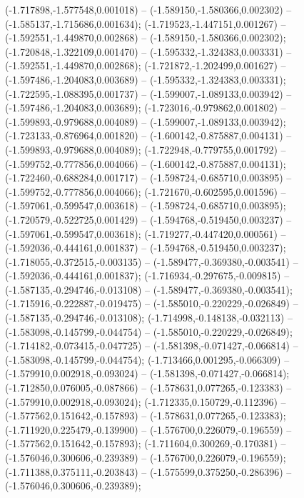  (-1.717898,-1.577548,0.001018) -- (-1.589150,-1.580366,0.002302) -- (-1.585137,-1.715686,0.001634);
 (-1.719523,-1.447151,0.001267) -- (-1.592551,-1.449870,0.002868) -- (-1.589150,-1.580366,0.002302);
 (-1.720848,-1.322109,0.001470) -- (-1.595332,-1.324383,0.003331) -- (-1.592551,-1.449870,0.002868);
 (-1.721872,-1.202499,0.001627) -- (-1.597486,-1.204083,0.003689) -- (-1.595332,-1.324383,0.003331);
 (-1.722595,-1.088395,0.001737) -- (-1.599007,-1.089133,0.003942) -- (-1.597486,-1.204083,0.003689);
 (-1.723016,-0.979862,0.001802) -- (-1.599893,-0.979688,0.004089) -- (-1.599007,-1.089133,0.003942);
 (-1.723133,-0.876964,0.001820) -- (-1.600142,-0.875887,0.004131) -- (-1.599893,-0.979688,0.004089);
 (-1.722948,-0.779755,0.001792) -- (-1.599752,-0.777856,0.004066) -- (-1.600142,-0.875887,0.004131);
 (-1.722460,-0.688284,0.001717) -- (-1.598724,-0.685710,0.003895) -- (-1.599752,-0.777856,0.004066);
 (-1.721670,-0.602595,0.001596) -- (-1.597061,-0.599547,0.003618) -- (-1.598724,-0.685710,0.003895);
 (-1.720579,-0.522725,0.001429) -- (-1.594768,-0.519450,0.003237) -- (-1.597061,-0.599547,0.003618);
 (-1.719277,-0.447420,0.000561) -- (-1.592036,-0.444161,0.001837) -- (-1.594768,-0.519450,0.003237);
 (-1.718055,-0.372515,-0.003135) -- (-1.589477,-0.369380,-0.003541) -- (-1.592036,-0.444161,0.001837);
 (-1.716934,-0.297675,-0.009815) -- (-1.587135,-0.294746,-0.013108) -- (-1.589477,-0.369380,-0.003541);
 (-1.715916,-0.222887,-0.019475) -- (-1.585010,-0.220229,-0.026849) -- (-1.587135,-0.294746,-0.013108);
 (-1.714998,-0.148138,-0.032113) -- (-1.583098,-0.145799,-0.044754) -- (-1.585010,-0.220229,-0.026849);
 (-1.714182,-0.073415,-0.047725) -- (-1.581398,-0.071427,-0.066814) -- (-1.583098,-0.145799,-0.044754);
 (-1.713466,0.001295,-0.066309) -- (-1.579910,0.002918,-0.093024) -- (-1.581398,-0.071427,-0.066814);
 (-1.712850,0.076005,-0.087866) -- (-1.578631,0.077265,-0.123383) -- (-1.579910,0.002918,-0.093024);
 (-1.712335,0.150729,-0.112396) -- (-1.577562,0.151642,-0.157893) -- (-1.578631,0.077265,-0.123383);
 (-1.711920,0.225479,-0.139900) -- (-1.576700,0.226079,-0.196559) -- (-1.577562,0.151642,-0.157893);
 (-1.711604,0.300269,-0.170381) -- (-1.576046,0.300606,-0.239389) -- (-1.576700,0.226079,-0.196559);
 (-1.711388,0.375111,-0.203843) -- (-1.575599,0.375250,-0.286396) -- (-1.576046,0.300606,-0.239389);
